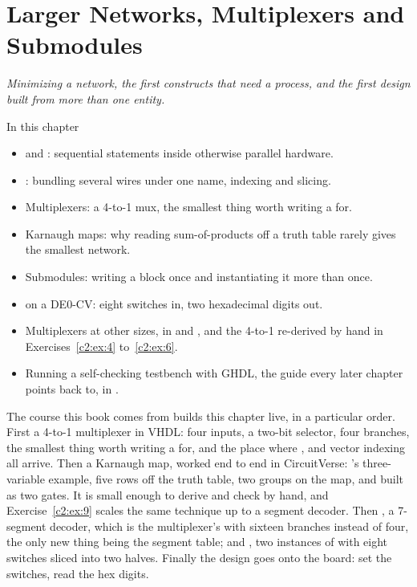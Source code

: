 
\chapter{Larger Networks, Multiplexers and Submodules}
\label{c2:ch}

{\large\itshape Minimizing a network, the first constructs that need a process, and the first design
built from more than one entity.\par}

\begin{chapterbox}{In this chapter}
\begin{itemize}
  \item {} and : sequential statements inside otherwise parallel hardware.
  \item {}: bundling several wires under one name, indexing and slicing.
  \item Multiplexers: a 4-to-1 mux, the smallest thing worth writing a  for.
  \item Karnaugh maps: why reading sum-of-products off a truth table rarely gives the smallest
    network.
  \item Submodules: writing a block once and instantiating it more than once.
  \item {} on a DE0-CV: eight switches in, two hexadecimal digits out.
  \item Multiplexers at other sizes, in  and , and the 4-to-1
    re-derived by hand in Exercises~\ref{c2:ex:4} to~\ref{c2:ex:6}.
  \item Running a self-checking testbench with GHDL, the guide every later chapter points back to,
    in .
\end{itemize}
\end{chapterbox}

The course this book comes from builds this chapter live, in a particular order. First a 4-to-1
multiplexer in VHDL: four inputs, a two-bit selector, four branches, the smallest thing worth
writing a  for, and the place where ,  and vector indexing all
arrive. Then a Karnaugh map, worked end to end in CircuitVerse: 's three-variable
example, five  rows off the truth table, two groups on the map, and  built
as two gates. It is small enough to derive and check by hand, and Exercise~\ref{c2:ex:9} scales the
same technique up to a segment decoder. Then , a 7-segment decoder, which is the
multiplexer's  with sixteen branches instead of four, the only new thing being the
segment table; and , two instances of  with eight switches sliced
into two halves. Finally the design goes onto the board: set the switches, read the hex digits.

